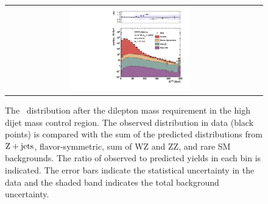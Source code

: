 \begin{table}[htb]
\begin{center}
\begin{tabular}{l|c|c|c|c}



\end{tabular}
\end{center}
\end{table}

\clearpage

\begin{figure}[!h]
\begin{center}
\begin{tabular}{cc}
\includegraphics[width=0.49\textwidth]{plots/met_metall.pdf}
\end{tabular}
\caption{The \MET\ distribution after the dilepton mass requirement in the high dijet mass control region. The observed distribution in data
(black points) is compared with the sum of the predicted distributions from $\rm{Z}+\rm{jets}$, flavor-symmetric, sum of WZ and ZZ, and rare SM backgrounds. 
The ratio of observed to predicted yields in each bin is
indicated. The error bars indicate the statistical uncertainty in the data and the shaded band indicates the total background uncertainty.
\label{fig:results_targ_control}
}
\end{center}
\end{figure}


